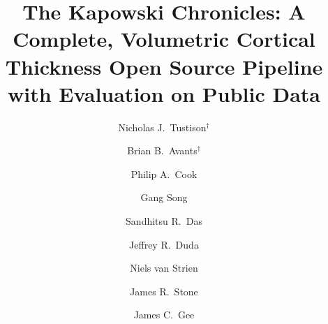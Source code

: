 \documentclass[preprint,authoryear,review,12pt]{elsarticle}
\begin{document}
\begin{frontmatter}

\title{The Kapowski Chronicles:  A Complete, Volumetric Cortical Thickness Open Source Pipeline with Evaluation on Public Data}



\author[label1]{Nicholas J.~Tustison$^\dagger$
  }
\author[label2]{Brian B.~Avants$^\dagger$}
\author[label2]{Philip A.~Cook}
\author[label2]{Gang Song}
\author[label2]{Sandhitsu R.~Das}
\author[label2]{Jeffrey R.~Duda}
\author[label3]{Niels van Strien}
\author[label1]{James R.~Stone}
\author[label2]{James C.~Gee}
\address[label1]{Department of Radiology and Medical Imaging, University of Virginia, Charlottesville, VA}
\address[label2]{Penn Image Computing and Science Laboratory, University of Pennsylvania,
                Philadelphia, PA}
\address[label3]{Department of Circulation and Medical Imaging,
  Norwegian University of Science and Technology, Trondheim,
  Norway}








\end{frontmatter}
\end{document}
